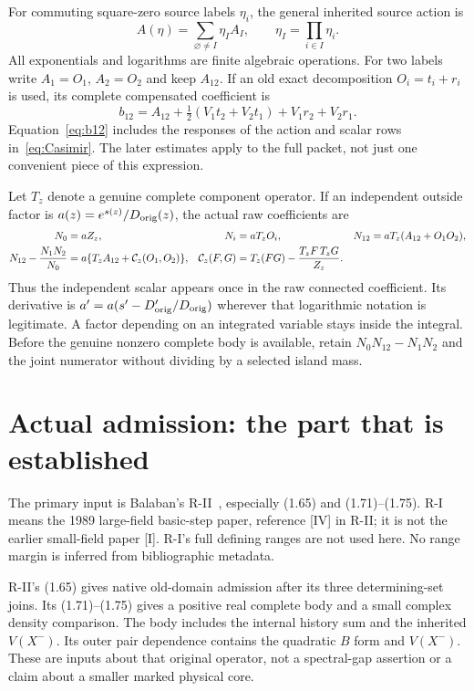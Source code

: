 \documentclass[11pt,letterpaper]{article}
\theoremstyle{plain}
\theoremstyle{remark}\newtheorem{remark}[theorem]{Scope}
\begin{document}
For commuting square-zero source labels $\eta_i$, the general inherited source
action is
\begin{equation}
A(\eta)=\sum_{\varnothing\ne I}\eta_I A_I,
\qquad \eta_I=\prod_{i\in I}\eta_i.
\label{eq:finiteaction}
\end{equation}
All exponentials and logarithms are finite algebraic operations. For two labels
write $A_1=O_1$, $A_2=O_2$ and keep $A_{12}$. If an old exact decomposition
$O_i=t_i+r_i$ is used, its complete compensated coefficient is
\begin{equation}
b_{12}=A_{12}+\tfrac12(V_1t_2+V_2t_1)+V_1r_2+V_2r_1.
\label{eq:b12}
\end{equation}
Equation~\eqref{eq:b12} includes the responses of the action and scalar rows
in~\eqref{eq:Casimir}. The later estimates apply to the full packet, not just
one convenient piece of this expression.

Let $T_z$ denote a genuine complete component operator. If an independent
outside factor is $a(z)=e^{s(z)}/D_{\rm orig}(z)$, the actual raw coefficients
are
\begin{align}
N_0&=aZ_z,&N_i&=aT_zO_i,&
N_{12}&=aT_z(A_{12}+O_1O_2),\notag\\
N_{12}-\frac{N_1N_2}{N_0}
&=a\{T_zA_{12}+\mathcal C_z(O_1,O_2)\},&
\mathcal C_z(F,G)&=T_z(FG)-\frac{T_zF\,T_zG}{Z_z}.
\label{eq:rawsource}
\end{align}
Thus the independent scalar appears once in the raw connected coefficient.
Its derivative is $a'=a(s'-D_{\rm orig}'/D_{\rm orig})$ wherever that
logarithmic notation is legitimate. A factor depending on an integrated
variable stays inside the integral. Before the genuine nonzero complete body
is available, retain $N_0N_{12}-N_1N_2$ and the joint numerator without dividing
by a selected island mass.

\section{Actual admission: the part that is established}
\label{sec:admission}

The primary input is Balaban's R-II~\cite{balabanRII}, especially (1.65) and
(1.71)--(1.75). R-I~\cite{balabanRI} means the 1989 large-field basic-step
paper, reference [IV] in R-II; it is not the earlier small-field paper [I].
R-I's full defining ranges are not used here. No range margin is inferred from bibliographic metadata.

R-II's (1.65) gives native old-domain admission after its three determining-set
joins. Its (1.71)--(1.75) gives a positive real complete body and a small complex
density comparison. The body includes the internal history sum and the inherited
$V(X^-)$. Its outer pair dependence contains the quadratic $B$ form and
$V(X^-)$. These are inputs about that original operator, not a spectral-gap
assertion or a claim about a smaller marked physical core.
\end{document}

